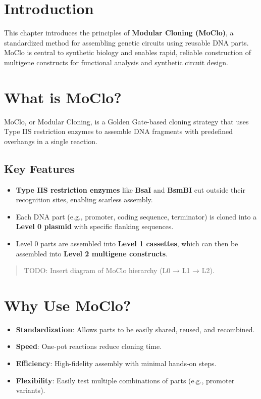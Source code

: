 \documentclass[
  letterpaper,
  DIV=11,
  numbers=noendperiod]{scrreprt}
\providecommand{\tightlist}{%
  \setlength{\itemsep}{0pt}\setlength{\parskip}{0pt}}\usepackage{longtable,booktabs,array}
\begin{document}
\section{Introduction}\label{introduction}

This chapter introduces the principles of \textbf{Modular Cloning
(MoClo)}, a standardized method for assembling genetic circuits using
reusable DNA parts. MoClo is central to synthetic biology and enables
rapid, reliable construction of multigene constructs for functional
analysis and synthetic circuit design.

\section{What is MoClo?}\label{what-is-moclo}

MoClo, or Modular Cloning, is a Golden Gate-based cloning strategy that
uses Type IIS restriction enzymes to assemble DNA fragments with
predefined overhangs in a single reaction.

\subsection{Key Features}\label{key-features}

\begin{itemize}
\tightlist
\item
  \textbf{Type IIS restriction enzymes} like \textbf{BsaI} and
  \textbf{BsmBI} cut outside their recognition sites, enabling scarless
  assembly.
\item
  Each DNA part (e.g., promoter, coding sequence, terminator) is cloned
  into a \textbf{Level 0 plasmid} with specific flanking sequences.
\item
  Level 0 parts are assembled into \textbf{Level 1 cassettes}, which can
  then be assembled into \textbf{Level 2 multigene constructs}.
\end{itemize}

\begin{quote}
TODO: Insert diagram of MoClo hierarchy (L0 → L1 → L2).
\end{quote}

\section{Why Use MoClo?}\label{why-use-moclo}

\begin{itemize}
\tightlist
\item
  \textbf{Standardization}: Allows parts to be easily shared, reused,
  and recombined.
\item
  \textbf{Speed}: One-pot reactions reduce cloning time.
\item
  \textbf{Efficiency}: High-fidelity assembly with minimal hands-on
  steps.
\item
  \textbf{Flexibility}: Easily test multiple combinations of parts
  (e.g., promoter variants).
\end{itemize}
\end{document}
